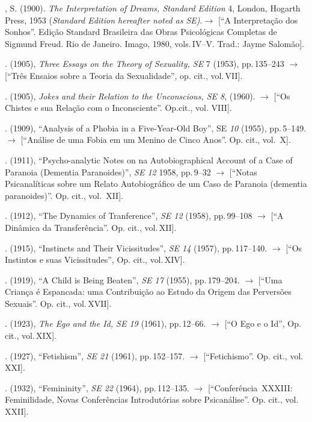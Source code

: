 \begin{description}
, S. (1900). \textit{The Interpretation of Dreams, Standard Edition }4,
London, Hogarth Press, 1953 (\textit{Standard Edition hereafter noted as
SE)}.{$\bm{\rightarrow}$} [``A Interpretação dos Sonhos''. Edição
Standard Brasileira das Obras Psicológicas Completas de Sigmund Freud. Rio de
Janeiro. Imago, 1980, vols.\,IV--V. Trad.: Jayme Salomão].

. (1905), \textit{Three Essays on the Theory of Sexuality, SE
}7\textit{ } (1953), pp.\,135--243 {$\bm{\rightarrow}$} [``Três Ensaios sobre a Teoria da
Sexualidade'', op. cit., vol.\,VII].

. (1905), \textit{Jokes and their Relation to the Unconscious,
SE 8}, (1960). {$\bm{\rightarrow}$} [``Os Chistes e sua Relação com o Inconsciente''.
Op.cit., vol. VIII].

. (1909), ``Analysis of a Phobia in a Five-Year-Old
Boy'', SE \textit{10} (1955), pp.\,5--149. {$\bm{\rightarrow}$} [``Análise de
uma Fobia em um Menino de Cinco Anos''. Op. cit., vol.~X].

. (1911), ``Psycho-analytic Notes on na
Autobiographical Account of a Case of Paranoia (Dementia
Paranoides)'', \textit{SE 12 }1958, pp.\,9--32 {$\bm{\rightarrow}$} [``Notas
Psicanalíticas sobre um Relato Autobiográfico de um Caso de Paranoia (dementia
paranoides)''. Op. cit., vol.~XII].

. (1912), ``The Dynamics of
Tranference'', \textit{SE 12 }(1958), pp.\,99--108 {$\bm{\rightarrow}$} [``A
Dinâmica da Transferência''. Op. cit., vol.\,XII].

. (1915), ``Instincts and Their
Vicissitudes'', \textit{SE 14 }(1957), pp.\,117--140.
{$\bm{\rightarrow}$} [``Os Instintos e suas Vicissitudes'', Op. cit., vol.\,XIV].

. (1919), ``A Child is Being Beaten'',
\textit{SE 17 }(1955), pp.\,179--204. {$\bm{\rightarrow}$} [``Uma Criança
é Espancada: uma Contribuição ao Estudo da Origem das Perversões
Sexuais''. Op. cit., vol.\,XVII].

. (1923), \textit{The Ego and the Id, SE 19 }(1961), pp.\,12--66.
{$\bm{\rightarrow}$} [``O Ego e o Id'', Op. cit., vol.\,XIX].

. (1927), ``Fetishism'', \textit{SE 21
}(1961), pp.\,152--157. {$\bm{\rightarrow}$} [``Fetichismo''. Op. cit., vol.\,XXI].

. (1932), ``Femininity'', \textit{SE
22 }(1964), pp.\,112--135. {$\bm{\rightarrow}$} [``Conferência~XXXIII: Feminilidade, Novas
Conferências Introdutórias sobre Psicanálise''. Op. cit., vol.\,XXII].


\end{description}
